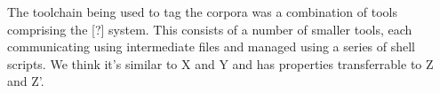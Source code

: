 The toolchain being used to tag the corpora was a combination of tools comprising the [?] system.  This consists of a number of smaller tools, each communicating using intermediate files and managed using a series of shell scripts.  We think it's similar to X and Y and has properties transferrable to Z and Z'.
